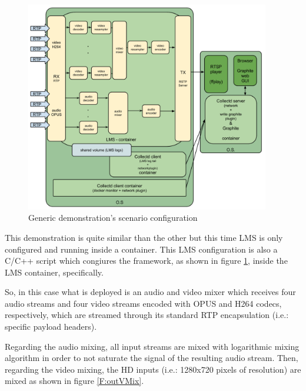 \begin{figure}[htb]
\begin{center}
\includegraphics[width=0.95\textwidth]{./images/genericScenario.png}
\caption{Generic demonstration's scenario configuration}
\label{F:gdsc}
\end{center}
\end{figure}

This demonstration is quite similar than the other but this time LMS is only configured and running inside a container. This LMS configuration is also a C/C++ script which congiures the framework, as shown in figure \ref{F:gdsc}, inside the LMS container, specifically.

So, in this case what is deployed is an audio and video mixer which receives four audio streams and four video streams encoded with OPUS and H264 codecs, respectively, which are streamed through its standard RTP encapsulation (i.e.: specific payload headers).

Regarding the audio mixing, all input streams are mixed with logarithmic mixing algorithm in order to not saturate the signal of the resulting audio stream. Then, regarding the video mixing, the HD inputs (i.e.: 1280x720 pixels of resolution) are mixed as shown in figure \ref{F:outVMix}.

